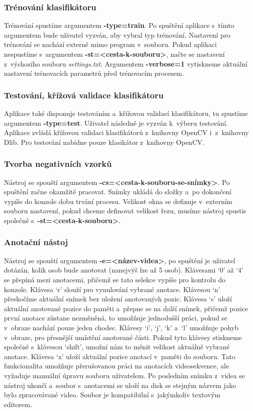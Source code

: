 \subsubsection*{Trénování klasifikátoru}
Trénování spustíme argumentem \textbf{-type=train}. Po spuštění aplikace s~tímto argumentem bude uživatel vyzván, aby vybral typ trénování. Nastavení pro trénování se nachází externě mimo program v~souboru. Pokud aplikaci nespustíme s~argumentem \textbf{-st=<cesta-k-souboru>}, načte se nastavení z~výchozího souboru \textit{settings.txt}. Argumentem \textbf{-verbose=1} vytiskneme aktuální nastavení trénovacích parametrů před trénovacím procesem.
\subsubsection*{Testování, křížová validace klasifikátoru}
Aplikace také disponuje testováním a~křížovou validací klasifikátoru, tu spustíme argumentem \textbf{-type=test}. Uživatel následně je vyzván k~výberu testování. Aplikace zvládá křížovou validaci klasifikátorů z~knihovny OpenCV i~z~knihovny Dlib. Pro testování nabídne pouze klasikátor z~knihovny OpenCV. 
\subsubsection*{}
\subsubsection*{Tvorba negativních vzorků}
Nástroj se spouští argumentem \textbf{-cs=<cesta-k-souboru-se-snímky>}. Po spuštění začne okamžitě pracovat. Snímky ukládá do složky  a~po dokončení vypíše do konzole dobu trvání procesu. Velikost okna se definuje v~externím souboru nastavení, pokud chceme definovat velikost řezu, musíme nástroj spustis společně s~\textbf{-st=<cesta-k-souboru>}.
\subsubsection*{Anotační nástoj}
Nástroj se spouští argumentem \textbf{-e=<název-videa>}, po spuštění je uživatel dotázán, kolik osob bude anotovat (nanejvýš lze až 5 osob).
Klávesami `0' až `4' se přepíná mezi anotacemi, přičemž se tato selekce vypíše pro kontrolu do konzole. Klávesa `r' slouží pro vynulování vybrané anotace. Klávesou `n' přeskočíme aktuální snímek bez uložení anotovaných pozic. Klávesa `s' uloží aktuální anotované pozice do paměti a~přepne se na další snímek, přičemž pozice první anotace zůstane nezměněná, to umožňuje jednodušší práci, pokud se v~obraze nachází pouze jeden chodec. Klávesy `i', `j', `k' a~`l' umožňuje pohyb v~obraze, pro přesnější umístění anotované části. Pokud tyto klávesy stiskneme společně s~klávesou `shift', umožní nám to měnit velikost aktuálně vybrané anotace. Klávesa `x' uloží aktuální pozice anotací v~paměti do souboru. Tato funkcionalita umožňuje přerušovanou práci na anotacích videosekvence, ale vyžaduje manuální úpravu souboru uživatelem. Po posledním snímku z~videa se nástroj ukončí a~soubor s~anotacemi se uloží na disk se stejným názvem jako bylo zpracovávané video. Soubor je kompatibilní s~jakýmkoliv textovým editorem.